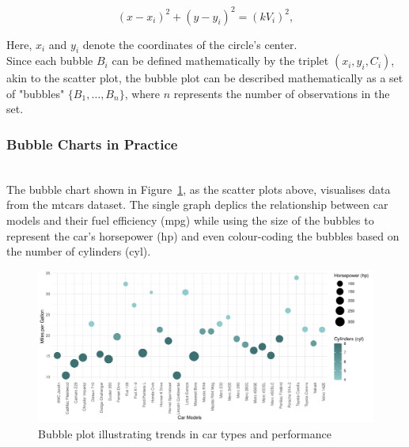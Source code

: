 \documentclass{article}\usepackage[]{graphicx}\usepackage[]{xcolor}
\makeatletter
\def\maxwidth{ %
  \ifdim\Gin@nat@width>\linewidth
    \linewidth
  \else
    \Gin@nat@width
  \fi
}
\newenvironment{knitrout}{}{} %
\numberwithin{equation}{section}
\makeatother
\begin{document}
\[
(x - x_i)^2 + (y - y_i)^2 = (kV_i)^2 ,
\]

\noindent Here, \(x_i\) and \(y_i\) denote the coordinates of the circle's center.\\

\noindent Since each bubble \(B_i\) can be defined mathematically by the triplet \((x_i, y_i, C_i)\), akin to the scatter plot, the bubble plot can be described mathematically as a set of "bubbles" \( \{B_1, \ldots, B_n\}\), where \(n\) represents the number of observations in the set.\\

\noindent
\subsubsection{Bubble Charts in Practice}\\

\noindent The bubble chart shown in Figure~\ref{fig:bubble-plot}, as the scatter plots above, visualises data from the mtcars dataset. The single graph deplics the relationship between car models and their fuel efficiency (mpg) while using the size of the bubbles to represent the car's horsepower (hp) and even colour-coding the bubbles based on the number of cylinders (cyl).\\

\begin{knitrout}\scriptsize
{}\color{fgcolor}\begin{figure}[H]

{\centering \includegraphics[width=\maxwidth]{figure/beamer-bubble-plot-1} 

}

\caption[Bubble plot illustrating trends in car types and performance]{Bubble plot illustrating trends in car types and performance}\label{fig:bubble-plot}
\end{figure}

\end{knitrout}
\end{document}
